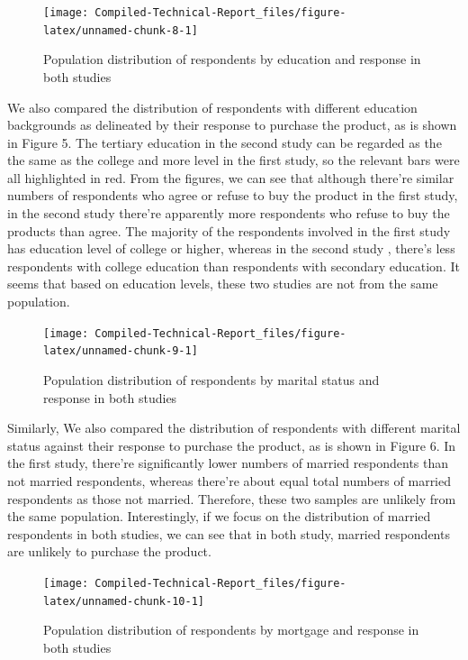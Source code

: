 \documentclass[]{article}
\begin{document}
\begin{figure}

{\centering \texttt{[image: Compiled-Technical-Report\_files/figure-latex/unnamed-chunk-8-1]} 

}

\caption{Population distribution of respondents by education and response in both studies}\label{fig:unnamed-chunk-8}
\end{figure}

We also compared the distribution of respondents with different
education backgrounds as delineated by their response to purchase the
product, as is shown in Figure 5. The tertiary education in the second
study can be regarded as the the same as the college and more level in
the first study, so the relevant bars were all highlighted in red. From
the figures, we can see that although there're similar numbers of
respondents who agree or refuse to buy the product in the first study,
in the second study there're apparently more respondents who refuse to
buy the products than agree. The majority of the respondents involved in
the first study has education level of college or higher, whereas in the
second study , there's less respondents with college education than
respondents with secondary education. It seems that based on education
levels, these two studies are not from the same population.

\begin{figure}

{\centering \texttt{[image: Compiled-Technical-Report\_files/figure-latex/unnamed-chunk-9-1]} 

}

\caption{Population distribution of respondents by marital status and response in both studies}\label{fig:unnamed-chunk-9}
\end{figure}

Similarly, We also compared the distribution of respondents with
different marital status against their response to purchase the product,
as is shown in Figure 6. In the first study, there're significantly
lower numbers of married respondents than not married respondents,
whereas there're about equal total numbers of married respondents as
those not married. Therefore, these two samples are unlikely from the
same population. Interestingly, if we focus on the distribution of
married respondents in both studies, we can see that in both study,
married respondents are unlikely to purchase the product.

\begin{figure}

{\centering \texttt{[image: Compiled-Technical-Report\_files/figure-latex/unnamed-chunk-10-1]} 

}

\caption{Population distribution of respondents by mortgage and response in both studies}\label{fig:unnamed-chunk-10}
\end{figure}
\end{document}

